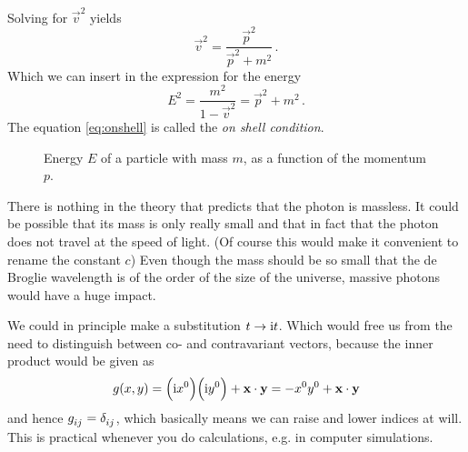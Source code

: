 Solving for $\vec{v}^2$ yields
\begin{equation}
    \vec{v}^2=\frac{\vec{p}^2}{\vec{p}^2+m^2}\, .
\end{equation}
Which we can insert in the expression for the energy
\begin{equation}
    E^2=\frac{m^2}{1-\vec{v}^2}=\vec{p}^2+m^2 \label{eq:onshell}\, .
\end{equation}
The equation \eqref{eq:onshell} is called the \emph{on shell condition}.
\begin{figure}
\centering
{}
\caption{Energy $E$ of a particle with mass $m$, as a function of the momentum
$p$.}
\end{figure}


\begin{sidenote}
There is nothing in the theory that predicts that the photon is massless. It
could be possible that its mass is only really small and that in fact that the
photon does not travel at the speed of light. (Of course this would make it
convenient to rename the constant $c$) Even though the mass should be so small
that the de Broglie wavelength is of the order of the size of the universe,
massive photons would have a huge impact.
\end{sidenote}
\begin{sidenote}
We could in principle make a substitution $t\to \mathrm{i} t$. Which would free us
from the need to distinguish between co- and contravariant vectors, because the
inner product would be given as
\begin{equation}
    g(x,y)=\left(\imI x^0\right)\left(\imI
    y^0\right)+\vec{x}\cdot\vec{y}=-x^0y^0+\vec{x}\cdot\vec{y}
\end{equation}
and hence $\tensor{g}{_i_j}=\tensor{\delta}{_i_j}$, which basically means we can
raise and lower indices at will. This is practical whenever you do calculations,
e.g. in computer simulations.
\end{sidenote}
